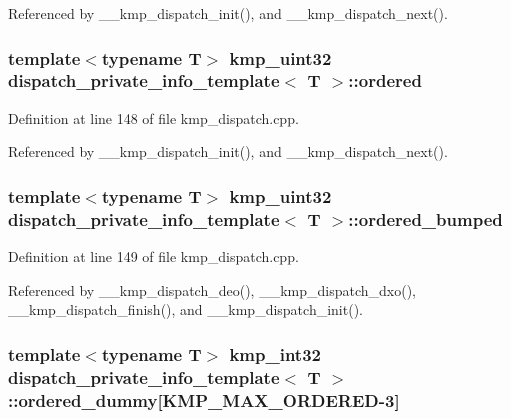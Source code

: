 Referenced by \-\_\-\-\_\-kmp\-\_\-dispatch\-\_\-init(), and \-\_\-\-\_\-kmp\-\_\-dispatch\-\_\-next().

\hypertarget{structdispatch__private__info__template_a2ab5d627f0ac9025d516a358a1da0101}{
\subsubsection[{ordered}]{\setlength{\rightskip}{0pt plus 5cm}template$<$typename T$>$ kmp\-\_\-uint32 {\bf dispatch\-\_\-private\-\_\-info\-\_\-template}$<$ T $>$\-::ordered}}\label{structdispatch__private__info__template_a2ab5d627f0ac9025d516a358a1da0101}


Definition at line 148 of file kmp\-\_\-dispatch.\-cpp.



Referenced by \-\_\-\-\_\-kmp\-\_\-dispatch\-\_\-init(), and \-\_\-\-\_\-kmp\-\_\-dispatch\-\_\-next().

\hypertarget{structdispatch__private__info__template_ac04a2f8dd76f45d3103abd5b070c9924}{
\subsubsection[{ordered\-\_\-bumped}]{\setlength{\rightskip}{0pt plus 5cm}template$<$typename T$>$ kmp\-\_\-uint32 {\bf dispatch\-\_\-private\-\_\-info\-\_\-template}$<$ T $>$\-::ordered\-\_\-bumped}}\label{structdispatch__private__info__template_ac04a2f8dd76f45d3103abd5b070c9924}


Definition at line 149 of file kmp\-\_\-dispatch.\-cpp.



Referenced by \-\_\-\-\_\-kmp\-\_\-dispatch\-\_\-deo(), \-\_\-\-\_\-kmp\-\_\-dispatch\-\_\-dxo(), \-\_\-\-\_\-kmp\-\_\-dispatch\-\_\-finish(), and \-\_\-\-\_\-kmp\-\_\-dispatch\-\_\-init().

\hypertarget{structdispatch__private__info__template_a3fae76529a54da350a12c6767ff85506}{
\subsubsection[{ordered\-\_\-dummy}]{\setlength{\rightskip}{0pt plus 5cm}template$<$typename T$>$ kmp\-\_\-int32 {\bf dispatch\-\_\-private\-\_\-info\-\_\-template}$<$ T $>$\-::ordered\-\_\-dummy\mbox{[}{\bf K\-M\-P\-\_\-\-M\-A\-X\-\_\-\-O\-R\-D\-E\-R\-E\-D}-\/3\mbox{]}}}\label{structdispatch__private__info__template_a3fae76529a54da350a12c6767ff85506}


